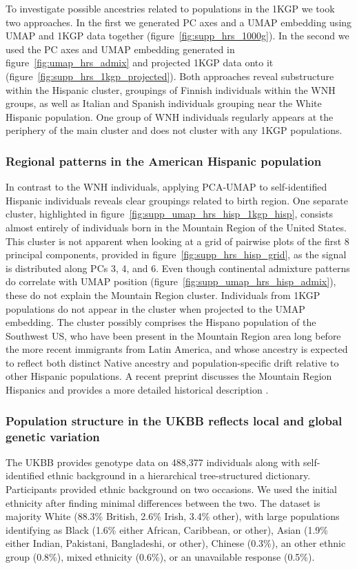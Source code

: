 \documentclass[12pt]{pnas-new}
\begin{document}
To investigate possible ancestries related to populations in the 1KGP we took two approaches. In the first we generated PC axes and a UMAP embedding using UMAP and 1KGP data together (figure~\ref{fig:supp_hrs_1000g}). In the second we used the PC axes and UMAP embedding generated in figure~\ref{fig:umap_hrs_admix} and projected 1KGP data onto it (figure~\ref{fig:supp_hrs_1kgp_projected}). Both approaches reveal substructure within the Hispanic cluster, groupings of Finnish individuals within the WNH groups, as well as Italian and Spanish individuals grouping near the White Hispanic population. One group of WNH individuals regularly appears at the periphery of the main cluster and does not cluster with any 1KGP populations.

\subsubsection*{Regional patterns in the American Hispanic population} In contrast to the WNH individuals, applying PCA-UMAP to self-identified Hispanic individuals reveals clear groupings related to birth region. One separate cluster, highlighted in figure~\ref{fig:supp_umap_hrs_hisp_1kgp_hisp}, consists almost entirely of individuals born in the Mountain Region of the United States. This cluster is not apparent when looking at a grid of pairwise plots of the first 8 principal components, provided in figure~\ref{fig:supp_hrs_hisp_grid}, as the signal is distributed along PCs 3, 4, and 6. Even though continental admixture patterns do correlate with UMAP position (figure~\ref{fig:supp_umap_hrs_hisp_admix}), these do not explain the Mountain Region cluster. Individuals from 1KGP populations do not appear in the cluster when projected to the UMAP embedding. The cluster possibly comprises the Hispano population of the Southwest US, who have been present in the Mountain Region area long before the more recent immigrants from Latin America, and whose ancestry is expected to reflect both distinct Native ancestry and population-specific drift relative to other Hispanic populations. A recent preprint discusses the Mountain Region Hispanics and provides a more detailed historical description \cite{Jordan333609}.  

\subsubsection*{Population structure in the UKBB reflects local and global genetic variation} The UKBB provides genotype data on 488,377 individuals along with self-identified ethnic background in a hierarchical tree-structured dictionary. Participants provided ethnic background on two occasions. We used the initial ethnicity after finding minimal differences between the two. The dataset is majority White (88.3\% British, 2.6\% Irish, 3.4\% other), with large populations identifying as Black (1.6\% either African, Caribbean, or other), Asian (1.9\% either Indian, Pakistani, Bangladeshi, or other), Chinese (0.3\%), an other ethnic group (0.8\%), mixed ethnicity (0.6\%), or an unavailable response (0.5\%). 
\end{document}
